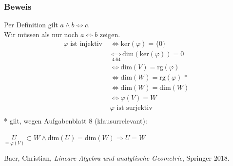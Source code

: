 \documentclass{article}
\begin{document}
\subsubsection*{Beweis}
Per Definition gilt $a \wedge b \Leftrightarrow c$. \\
Wir müssen als nur noch $a \Leftrightarrow b$ zeigen. \\
\begin{align*}
    \varphi \text{ ist injektiv } &\Leftrightarrow \text{ker}(\varphi) = \{0\} \\
    &\underset{4.64}{\Leftrightarrow} \text{dim}(\text{ker}(\varphi)) = 0 \\
    &\Leftrightarrow \text{dim}(V) = \text{rg}(\varphi) \\
    &\Leftrightarrow \text{dim}(W) = \text{rg}(\varphi) \text{ * } \\
    &\Leftrightarrow \text{dim}(W) = \text{dim}(W) \\
    &\Leftrightarrow \varphi(V) = W \\  
    &\varphi \text{ ist surjektiv} \\
\end{align*}
* gilt, wegen Aufgabenblatt 8 (klausurrelevant): \\
\begin{center}
    $\underset{= \varphi(V)}{U} \subset W \wedge \text{dim}(U) = \text{dim}(W) \Rightarrow U = W$ \\
\end{center}


\newpage
\begin{thebibliography}{9}
    Baer, Christian,
    \emph{Lineare Algebra und analytische Geometrie},
    Springer 2018.
    \end{thebibliography}
\end{document}
